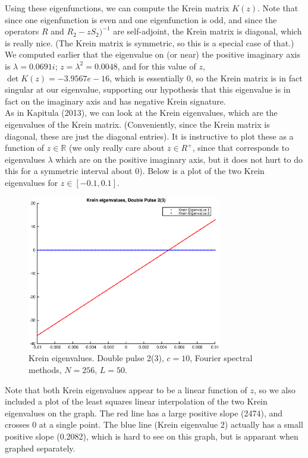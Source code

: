 \documentclass[12pt]{article}
\def\R{{\mathbb R}}
\begin{document}
Using these eigenfunctions, we can compute the Krein matrix $K(z)$. Note that since one eigenfunction is even and one eigenfunction is odd, and since the operators $R$ and $R_2 - zS_2 )^{-1}$ are self-adjoint, the Krein matrix is diagonal, which is really nice. (The Krein matrix is symmetric, so this is a special case of that.)\\

We computed earlier that the eigenvalue on (or near) the positive imaginary axis is $\lambda = 0.0691i$; $z = \lambda^2 = 0.0048$, and for this value of $z$, $\det K(z) = -3.9567e-16$, which is essentially 0, so the Krein matrix is in fact singular at our eigenvalue, supporting our hypothesis that this eigenvalue is in fact on the imaginary axis and has negative Krein signature. \\

As in Kapitula (2013), we can look at the Krein eigenvalues, which are the eigenvalues of the Krein matrix. (Conveniently, since the Krein matrix is diagonal, these are just the diagonal entries). It is instructive to plot these as a function of $z \in \R$ (we only really care about $z \in R^+$, since that corresponds to eigenvalues $\lambda$ which are on the positive imaginary axis, but it does not hurt to do this for a symmetric interval about 0). Below is a plot of the two Krein eigenvalues for $z \in [-0.1, 0.1]$.

\begin{figure}[H]
	\includegraphics[width=8.5cm]{dp2kreineig1}
	\caption{Krein eigenvalues. Double pulse 2(3), $c = 10$, Fourier spectral methods, $N = 256$, $L = 50$. }
\end{figure}

Note that both Krein eigenvalues appear to be a linear function of $z$, so we also included a plot of the least squares linear interpolation of the two Krein eigenvalues on the graph. The red line has a large positive slope (2474), and crosses 0 at a single point. The blue line (Krein eigenvalue 2) actually has a small positive slope (0.2082), which is hard to see on this graph, but is apparant when graphed separately.
\end{document}
